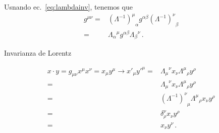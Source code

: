 \begin{frame}
Usnando ec.~\eqref{eq:lambdainv}, tenemos que
\begin{align}
  \label{eq:Lambdacontra}
  g^{\mu\nu}=&{\left( \Lambda^{-1} \right)^{\mu}}_{\alpha}g^{\alpha\beta} {\left( \Lambda^{-1} \right)^{\nu}}_{\beta}\nonumber\\
=&{\Lambda_{\alpha}}^{\mu}g^{\alpha\beta}{\Lambda_{\beta}}^{\nu}\,.           
\end{align}


\end{frame}



\begin{frame}
\begin{example}
  


Invarianza de Lorentz

  \begin{align}
  x\cdot y= g_{\mu\nu}x^{\mu}x^{\nu}=  x_\mu y^\mu\to x'_\mu{y'}^\mu=&{\Lambda_\mu}^\nu x_\nu{\Lambda^\mu}_\rho y^\rho \nonumber\\
    =&{\Lambda_\mu}^\nu x_\nu{\Lambda^\mu}_\rho y^\rho \nonumber\\
    =&{\left(\Lambda^{-1}\right)^\nu}_\mu{\Lambda^\mu}_\rho x_\nu y^\rho \nonumber\\
    =&\delta^\nu_\rho x_\nu y^\rho \nonumber\\
    =&x_\nu y^\nu \nonumber\,.
  \end{align}

\end{example}

\end{frame}

